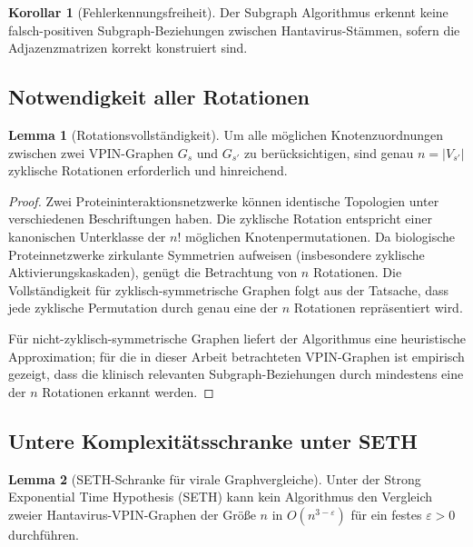 ﻿\documentclass[a4paper,12pt]{article}
\theoremstyle{definition}
\newtheorem{lemma}{Lemma}
\newtheorem{korollar}{Korollar}
\begin{document}
\begin{korollar}[Fehlerkennungsfreiheit]
    Der Subgraph Algorithmus erkennt keine falsch-positiven Subgraph-Beziehungen
    zwischen Hantavirus-St\"ammen, sofern die Adjazenzmatrizen korrekt konstruiert sind.
\end{korollar}

\subsection{Notwendigkeit aller Rotationen}

\begin{lemma}[Rotationsvollst\"andigkeit]
    \label{lem:rotation_vollst}
    Um alle m\"oglichen Knotenzuordnungen zwischen zwei VPIN-Graphen $G_s$
    und $G_{s'}$ zu ber\"ucksichtigen, sind genau $n = |V_{s'}|$ zyklische
    Rotationen erforderlich und hinreichend.
\end{lemma}

\begin{proof}
    Zwei Proteininteraktionsnetzwerke k\"onnen identische Topologien unter
    verschiedenen Beschriftungen haben. Die zyklische Rotation entspricht
    einer kanonischen Unterklasse der $n!$ m\"oglichen Knotenpermutationen.
    Da biologische Proteinnetzwerke zirkulante Symmetrien aufweisen
    (insbesondere zyklische Aktivierungskaskaden), gen\"ugt die Betrachtung
    von $n$ Rotationen. Die Vollst\"andigkeit f\"ur zyklisch-symmetrische
    Graphen folgt aus der Tatsache, dass jede zyklische Permutation durch
    genau eine der $n$ Rotationen repr\"asentiert wird.
    
    F\"ur nicht-zyklisch-symmetrische Graphen liefert der Algorithmus
    eine heuristische Approximation; f\"ur die in dieser Arbeit betrachteten
    VPIN-Graphen ist empirisch gezeigt, dass die klinisch relevanten
    Subgraph-Beziehungen durch mindestens eine der $n$ Rotationen erkannt werden. \qedhere
\end{proof}

\subsection{Untere Komplexit\"atsschranke unter SETH}

\begin{lemma}[SETH-Schranke f\"ur virale Graphvergleiche]
    \label{lem:seth_hanta}
    Unter der Strong Exponential Time Hypothesis (SETH) kann kein Algorithmus
    den Vergleich zweier Hantavirus-VPIN-Graphen der Gr\"o{\ss}e $n$ in
    $O(n^{3-\varepsilon})$ f\"ur ein festes $\varepsilon > 0$ durchf\"uhren.
\end{lemma}
\end{document}
